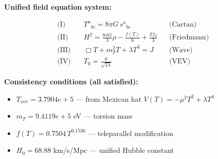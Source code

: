 
\textbf{Unified field equation system:}

\begin{align}
  \text{(I)} \quad & T^a{}_{bc} = 8\pi G \, s^a{}_{bc} && \text{(Cartan)} \\
  \text{(II)} \quad & H^2 = \frac{8\pi G}{3}\rho - \frac{f(T)}{6} + \frac{Tf_T}{3} && \text{(Friedmann)} \\
  \text{(III)} \quad & \Box T + m_T^2 T + \lambda T^3 = J && \text{(Wave)} \\
  \text{(IV)} \quad & T_0 = \frac{\mu}{\sqrt{2\lambda}} && \text{(VEV)}
\end{align}

\textbf{Consistency conditions (all satisfied):}
\begin{itemize}
  \item $T_{\text{vev}} = 3.7904e+5$ — from Mexican hat $V(T) = -\mu^2 T^2 + \lambda T^4$
  \item $m_T = 9.4119e+5$ eV — torsion mass
  \item $f(T) = 0.7504 \, T^{0.1536}$ — teleparallel modification
  \item $H_0 = 68.88$ km/s/Mpc — unified Hubble constant
\end{itemize}